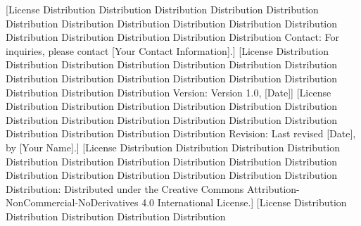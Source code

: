 [License Distribution Distribution Distribution Distribution Distribution Distribution Distribution Distribution Distribution Distribution Distribution Distribution Distribution Distribution Distribution Distribution Contact: For inquiries, please contact [Your Contact Information].]  
[License Distribution Distribution Distribution Distribution Distribution Distribution Distribution Distribution Distribution Distribution Distribution Distribution Distribution Distribution Distribution Distribution Version: Version 1.0, [Date]]  
[License Distribution Distribution Distribution Distribution Distribution Distribution Distribution Distribution Distribution Distribution Distribution Distribution Distribution Distribution Distribution Distribution Revision: Last revised [Date], by [Your Name].]  
[License Distribution Distribution Distribution Distribution Distribution Distribution Distribution Distribution Distribution Distribution Distribution Distribution Distribution Distribution Distribution Distribution Distribution: Distributed under the Creative Commons Attribution-NonCommercial-NoDerivatives 4.0 International License.]  
[License Distribution Distribution Distribution Distribution Distribution